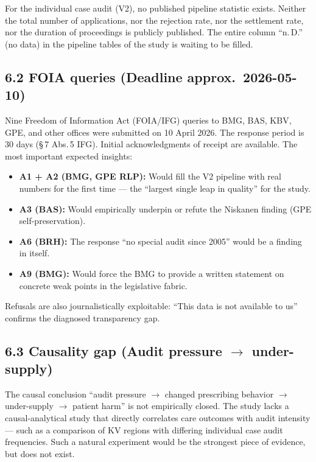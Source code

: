\documentclass{umbruch-position}
\begin{document}
For the individual case audit (V2), no published pipeline statistic exists. Neither the total number of applications, nor the rejection rate, nor the settlement rate, nor the duration of proceedings is publicly published. The entire column ``n.\,D.'' (no data) in the pipeline tables of the study is waiting to be filled.

\subsection*{6.2 FOIA queries (Deadline approx.\ 2026-05-10)}

Nine Freedom of Information Act (FOIA/IFG) queries to BMG, BAS, KBV, GPE, and other offices were submitted on 10 April 2026. The response period is 30 days (\S\,7 Abs.\,5 IFG). Initial acknowledgments of receipt are available. The most important expected insights:

\begin{itemize}
  \item \textbf{A1 + A2 (BMG, GPE RLP):} Would fill the V2 pipeline with real numbers for the first time --- the ``largest single leap in quality'' for the study.
  \item \textbf{A3 (BAS):} Would empirically underpin or refute the Niskanen finding (GPE self-preservation).
  \item \textbf{A6 (BRH):} The response ``no special audit since 2005'' would be a finding in itself.
  \item \textbf{A9 (BMG):} Would force the BMG to provide a written statement on concrete weak points in the legislative fabric.
\end{itemize}

Refusals are also journalistically exploitable: ``This data is not available to us'' confirms the diagnosed transparency gap.

\subsection*{6.3 Causality gap (Audit pressure $\to$ under-supply)}

The causal conclusion ``audit pressure $\to$ changed prescribing behavior $\to$ under-supply $\to$ patient harm'' is not empirically closed. The study lacks a causal-analytical study that directly correlates care outcomes with audit intensity --- such as a comparison of KV regions with differing individual case audit frequencies. Such a natural experiment would be the strongest piece of evidence, but does not exist.
\end{document}
